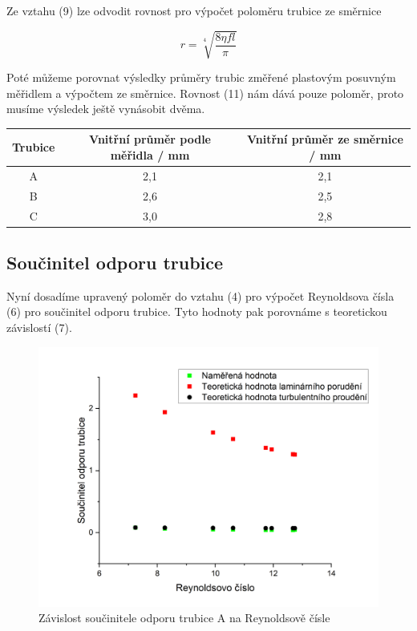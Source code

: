     Ze vztahu (9) lze odvodit rovnost pro výpočet poloměru trubice ze směrnice

    \begin{equation}
        r = \sqrt[4]{\frac{8\eta fl}{\pi}}
    \end{equation}

    Poté můžeme porovnat výsledky průměry trubic změřené plastovým posuvným měřidlem a výpočtem ze směrnice. Rovnost (11) nám dává pouze poloměr, proto musíme výsledek ještě vynásobit dvěma.

    \begin{table}[h]
        \centering
        \begin{tabular}{|c|c|c|} 
        \hline
            Trubice & Vnitřní průměr podle měřidla / mm & Vnitřní průměr ze směrnice / mm  \\ 
        \hline
            A       & 2,1                           & 2,1                              \\
            B       & 2,6                           & 2,5                              \\
            C       & 3,0                           & 2,8                              \\
        \hline
        \end{tabular}
    \end{table}

\subsection{Součinitel odporu trubice}

    Nyní dosadíme upravený poloměr do vztahu (4) pro výpočet Reynoldsova čísla (6) pro součinitel odporu trubice. Tyto hodnoty pak porovnáme s teoretickou závislostí (7).

    \begin{figure}[h]
        \centering
        \includegraphics[width=0.6\linewidth]{01 - Studium proudění viskózní kapaliny trubicemi kruhového průřezu//Protokol//img/Re(k) A.png}
        \caption{Závislost součinitele odporu trubice A na Reynoldsově čísle}
        \label{fig:Re(k) A}
    \end{figure}    

